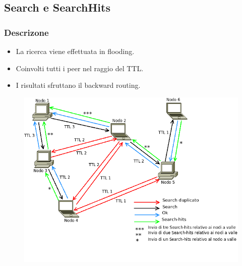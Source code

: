 \documentclass[a4paper,italian,12pt]{beamer}
\begin{document}
		\subsection{Search e SearchHits}
			\begin{frame}
				\frametitle{Descrizone}
				\begin{itemize}
					\item La ricerca viene effettuata in flooding.
					\item Coinvolti tutti i peer nel raggio del TTL.
					\item I risultati sfruttano il backward routing.
				\end{itemize}
				\begin{figure}[H]
					\begin{center}
						\includegraphics[scale=0.3]{etc/Search_overlay.png}
					\end{center}
				\end{figure}
			\end{frame}
\end{document}
